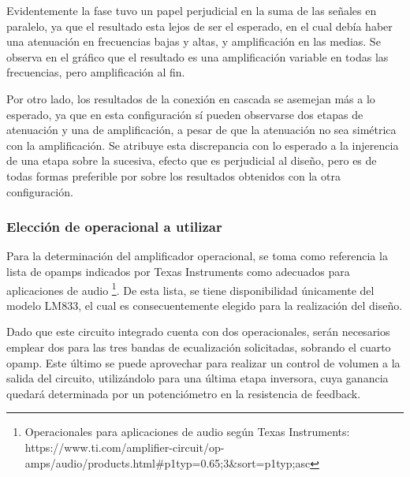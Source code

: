 Evidentemente la fase tuvo un papel perjudicial en la suma de las señales en paralelo, ya que el resultado esta lejos de ser el esperado, en el cual debía haber una 
atenuación en frecuencias bajas y altas, y amplificación en las medias.
Se observa en el gráfico que el resultado es una amplificación variable en todas las frecuencias, pero amplificación al fin. \par
Por otro lado, los resultados de la conexión en cascada se asemejan más a lo esperado, ya que en esta configuración sí pueden observarse dos etapas de atenuación y una de 
amplificación, a pesar de que la atenuación no sea simétrica con la amplificación. Se atribuye esta discrepancia con lo esperado a la injerencia de una etapa sobre la 
sucesiva, efecto que es perjudicial al diseño, pero es de todas formas preferible por sobre los resultados obtenidos con la otra configuración.


\subsubsection{Elección de operacional a utilizar}
Para la determinación del amplificador operacional, se toma como referencia la lista de opamps indicados por Texas Instruments como adecuados para aplicaciones de audio
\footnote{Operacionales para aplicaciones de audio según Texas Instruments: \\https://www.ti.com/amplifier-circuit/op-amps/audio/products.html\#p1typ=0.65;3\&sort=p1typ;asc}.
De esta lista, se tiene disponibilidad únicamente del modelo LM833, el cual es consecuentemente elegido para la realización del diseño.\par
Dado que este circuito integrado cuenta con dos operacionales, serán necesarios emplear dos para las tres bandas de ecualización solicitadas, sobrando el cuarto opamp.
Este último se puede aprovechar para realizar un control de volumen a la salida del circuito, utilizándolo para una última etapa inversora, cuya ganancia quedará 
determinada por un potenciómetro en la resistencia de feedback.




